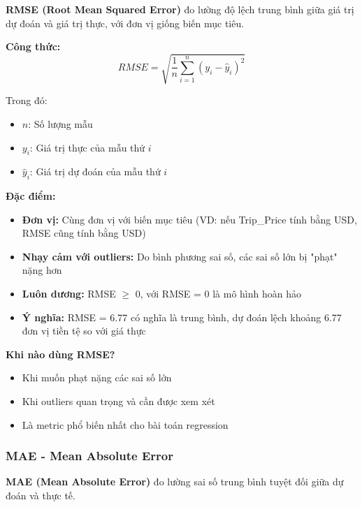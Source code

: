 \documentclass[12pt,a4paper]{article}
\begin{document}
\begin{definitionbox}
\textbf{RMSE (Root Mean Squared Error)} đo lường độ lệch trung bình giữa giá trị dự đoán và giá trị thực, với đơn vị giống biến mục tiêu.
\end{definitionbox}

\textbf{Công thức:}
\begin{equation}
RMSE = \sqrt{\frac{1}{n}\sum_{i=1}^{n}(y_i - \hat{y}_i)^2}
\end{equation}

Trong đó:
\begin{itemize}
    \item $n$: Số lượng mẫu
    \item $y_i$: Giá trị thực của mẫu thứ $i$
    \item $\hat{y}_i$: Giá trị dự đoán của mẫu thứ $i$
\end{itemize}

\textbf{Đặc điểm:}
\begin{itemize}
    \item \textbf{Đơn vị:} Cùng đơn vị với biến mục tiêu (VD: nếu Trip\_Price tính bằng USD, RMSE cũng tính bằng USD)
    \item \textbf{Nhạy cảm với outliers:} Do bình phương sai số, các sai số lớn bị "phạt" nặng hơn
    \item \textbf{Luôn dương:} RMSE $\geq$ 0, với RMSE = 0 là mô hình hoàn hảo
    \item \textbf{Ý nghĩa:} RMSE = 6.77 có nghĩa là trung bình, dự đoán lệch khoảng 6.77 đơn vị tiền tệ so với giá thực
\end{itemize}

\textbf{Khi nào dùng RMSE?}
\begin{itemize}
    \item Khi muốn phạt nặng các sai số lớn
    \item Khi outliers quan trọng và cần được xem xét
    \item Là metric phổ biến nhất cho bài toán regression
\end{itemize}

\subsubsection{MAE - Mean Absolute Error}

\begin{definitionbox}
\textbf{MAE (Mean Absolute Error)} đo lường sai số trung bình tuyệt đối giữa dự đoán và thực tế.
\end{definitionbox}
\end{document}
